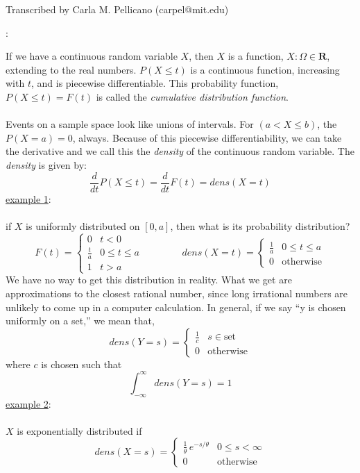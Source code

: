 \newline
{}\newline
Transcribed by Carla M. Pellicano (carpel@mit.edu)\newline

:

If we have a continuous random variable $X$, then $X$ is a function, $X:\Omega\in\mathbf{R}$, extending to the real numbers.  $P(X\leq t)$ is a continuous function, increasing with $t$, and is piecewise differentiable.  This probability function, $P(X\leq t)=F(t)$ is called the {\em cumulative distribution function}.\\\\Events on a sample space look like unions of intervals.  For $(a<X\leq b)$, the $P(X=a)=0$, always.  Because of this piecewise differentiability, we can take the derivative and we call this the {\em density} of the continuous random variable.  The {\em density} is given by:
$$\frac{d}{dt}P(X\leq t)=\frac{d}{dt}F(t)=dens(X=t)$$
\underline{example 1}:\\\\if $X$ is uniformly distributed on $[0,a]$, then what is its probability distribution?
$$F(t)= \left\{\begin{array} {lll} 0 & t<0\\\frac{t}{a} & 0\leq t\leq a\\1 & t>a \end{array}\right.\qquad\qquad dens(X=t)=\left\{\begin{array}{ll}\frac{1}{a} & 0\leq t\leq a\\0 & \mbox{otherwise}\end{array}\right.$$
We have no way to get this distribution in reality.  What we get are approximations to the closest rational number, since long irrational numbers are unlikely to come up in a computer calculation.  In general, if we say ``y is chosen uniformly on a set,'' we mean that, 
$$dens(Y=s)=\left\{\begin{array}{ll}\frac{1}{c}&s\in \mbox{set }\\0&\mbox{otherwise}\end{array}\right.$$
where $c$ is chosen such that $$\displaystyle\int_{-\infty}^{\infty} dens(Y=s)=1$$
\underline{example 2}:\\\\$X$ is exponentially distributed if
$$dens(X=s)=\left\{\begin{array}{ll}\frac{1}{\theta}\,e^{-s/\theta}&0\leq s<\infty\\0&\mbox{otherwise}\end{array}\right.$$
